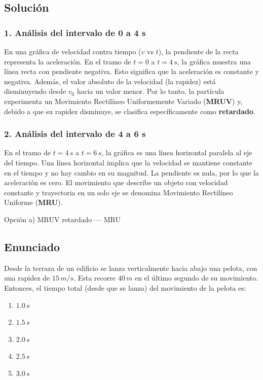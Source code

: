 \documentclass[12pt, a4paper]{article}
\begin{document}
\subsection*{Solución}

\subsubsection*{1. Análisis del intervalo de 0 a 4 s}
En una gráfica de velocidad contra tiempo ($v$ vs $t$), la pendiente de la recta representa la aceleración.
En el tramo de $t=0$ a $t=4 \, \si{s}$, la gráfica muestra una línea recta con pendiente negativa. Esto significa que la aceleración es constante y negativa. Además, el valor absoluto de la velocidad (la rapidez) está disminuyendo desde $v_0$ hacia un valor menor.
Por lo tanto, la partícula experimenta un Movimiento Rectilíneo Uniformemente Variado (\textbf{MRUV}) y, debido a que su rapidez disminuye, se clasifica específicamente como \textbf{retardado}.

\subsubsection*{2. Análisis del intervalo de 4 a 6 s}
En el tramo de $t=4 \, \si{s}$ a $t=6 \, \si{s}$, la gráfica es una línea horizontal paralela al eje del tiempo.
Una línea horizontal implica que la velocidad se mantiene constante en el tiempo y no hay cambio en su magnitud. La pendiente es nula, por lo que la aceleración es cero.
El movimiento que describe un objeto con velocidad constante y trayectoria en un solo eje se denomina Movimiento Rectilíneo Uniforme (\textbf{MRU}).

\begin{tcolorbox}[colback=green!5!white, colframe=green!50!black, title=Respuesta Final]
\centering Opción a) MRUV retardado --- MRU
\end{tcolorbox}

\newpage

\subsection*{Enunciado}
Desde la terraza de un edificio se lanza verticalmente hacia abajo una pelota, con una rapidez de $15 \, \si{m/s}$. Esta recorre $40 \, \si{m}$ en el último segundo de su movimiento. Entonces, el tiempo total (desde que se lanza) del movimiento de la pelota es:
\begin{enumerate}[label=\alph*)]
    \item $1.0 \, \si{s}$
    \item $1.5 \, \si{s}$
    \item $2.0 \, \si{s}$
    \item $2.5 \, \si{s}$
    \item $3.0 \, \si{s}$
\end{enumerate}
\end{document}
